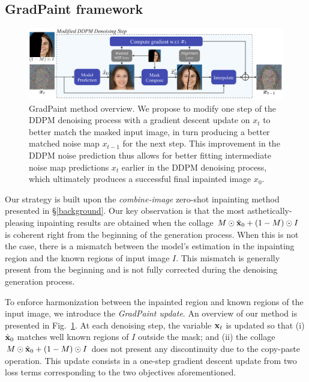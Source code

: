 \subsection{GradPaint framework}

\begin{figure}[h]
  \centering
    \includegraphics[width=\textwidth]{images/gradpaint/method.pdf}
    \caption{GradPaint method overview. We propose to modify one step of the DDPM denoising process with a gradient descent update on $x_t$ to better match the masked input image, in turn producing a better matched noise map $x_{t-1}$ for the next step. This improvement in the DDPM noise prediction thus allows for better fitting intermediate noise map predictions $x_t$ earlier in the DDPM denoising process, which ultimately produces a successful final inpainted image $x_0$.}
    \label{fig:method}
\end{figure}


Our strategy is built upon the \textit{combine-image} zero-shot inpainting method presented in \S\ref{background}.
 Our key observation is that the most asthetically-pleasing inpainting results are obtained when the 
 collage $M \odot \hat{\mathbf{x}}_0 + (1-M) \odot I$ is coherent right from the beginning of the generation process.
  When this is not the case, there is a mismatch between the model's estimation in the inpainting region and 
  the known regions of input image $I$. This mismatch is generally present from the beginning and is not fully 
  corrected during the denoising generation process. 

To enforce harmonization between the inpainted region and known regions of the input image, we introduce the 
\textit{GradPaint update}. An overview of our method is presented in Fig.~\ref{fig:method}.
At each denoising step, the variable $\mathbf{x}_t$ is updated so that (i) $\hat{\mathbf{x}}_0$ matches well known regions of 
$I$ outside the mask; and (ii) the collage $M \odot \hat{\mathbf{x}}_0 + (1-M) \odot I$ does not present any discontinuity 
due to the copy-paste operation. This update consists in a one-step gradient descent update from two loss terms
 corresponding to the two objectives aforementioned.


